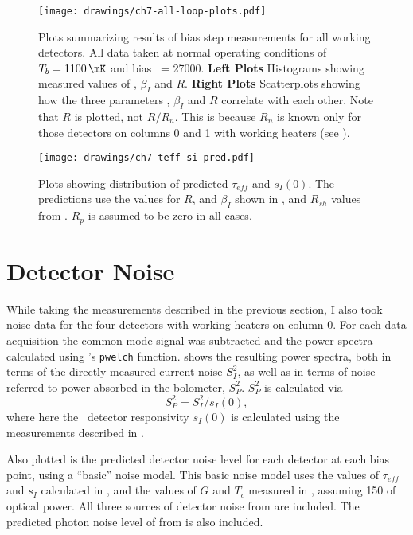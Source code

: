 \begin{figure*}
  \centering
\texttt{[image: drawings/ch7-all-loop-plots.pdf]}
\caption{
  Plots summarizing results of bias step measurements for all working detectors.
All data taken at normal operating conditions of $T_{b} = \SI{1100}{\mK}$ and bias \DAC\ = 27000.
\textbf{Left Plots}
Histograms showing measured values of \Loop, $\beta_I$ and $R$.
\textbf{Right Plots}
Scatterplots showing how the three parameters \Loop, $\beta_I$ and $R$ correlate with each other.
Note that $R$ is plotted, not $R/R_n$. This is because $R_n$ is known only for those detectors on columns 0 and 1 with working heaters (see ).
}
\label{fig:ch7-all-loop-plots}
\end{figure*}

\begin{figure*}
  \centering
\texttt{[image: drawings/ch7-teff-si-pred.pdf]}
\caption{
  Plots showing distribution of predicted $\tau_{eff}$ and $s_I(0)$. The predictions use the values for $R$, \Loop and $\beta_I$ shown in , and $R_{sh}$ values from . $R_p$ is assumed to be zero in all cases.
}
\label{fig:ch7-teff-si-pred}
\end{figure*}

\section{Detector Noise} \label{sec:det-noise}

While taking the measurements described in the previous section, I also took noise data for the four detectors with working heaters on column 0.
For each data acquisition the common mode signal was subtracted and the power spectra calculated using \MATLAB's \texttt{pwelch} function.
 shows the resulting power spectra, both in terms of the directly measured current noise $S^2_I$, as well as in terms of noise referred to power absorbed in the bolometer, $S^2_{P}$.
$S^2_{P}$ is calculated via
\begin{equation}
 S^2_{P} = S^2_I / s_I(0),
\end{equation}
where here the \DC\ detector responsivity $s_I(0)$ is calculated using the measurements described in .

Also plotted is the predicted detector noise level for each detector at each bias point, using a ``basic'' noise model.
This basic noise model uses the values of $\tau_{eff}$ and $s_I$ calculated in , and the values of $G$ and $T_c$ measured in , assuming \SI{150}{\pW} of optical power.
All three sources of detector noise from  are included.
The predicted photon noise level of  from  is also included.

